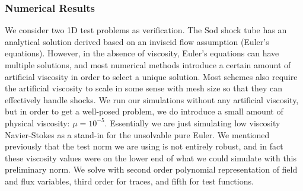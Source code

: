 \documentclass[preprint,12pt]{elsarticle}
\begin{document}
%                                                                                    
%                                                                                    
% 
\subsubsection{Numerical Results}
We consider two 1D test problems as verification.
The Sod shock tube has an analytical solution derived based on an inviscid flow assumption (Euler's equations).
However, in the absence of viscosity, Euler's equations can have multiple solutions, and most numerical methods introduce a certain amount of
artificial viscosity in order to select a unique solution.
Most schemes also require the artificial viscosity to scale in some sense with mesh size so that they can effectively handle shocks.
We run our simulations without any artificial viscosity, but in order to get a well-posed problem, we do introduce a small amount of physical
viscosity: $\mu=10^{-5}$.
Essentially we are just simulating low viscosity Navier-Stokes as a stand-in for the unsolvable pure Euler.
We mentioned previously that the test norm we are using is not entirely robust, and in fact these viscosity values were on the lower end of what we
could simulate with this preliminary norm.
We solve with second order polynomial representation of field and flux variables, third order for traces, and fifth for test functions.
\end{document}
